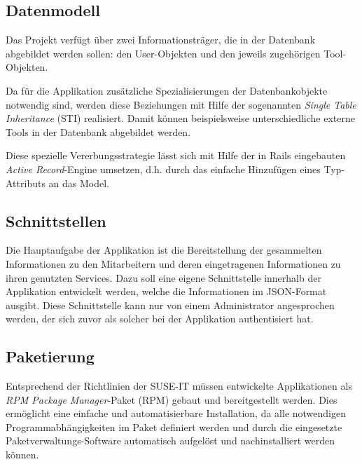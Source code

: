 \subsection{Datenmodell}
\label{sec:Datenmodell}
Das Projekt verfügt über zwei Informationsträger, die in der Datenbank abgebildet werden
sollen: den User-Objekten und den jeweils zugehörigen Tool-Objekten.


Da für die Applikation zusätzliche Spezialisierungen der Datenbankobjekte notwendig sind, werden
diese Beziehungen mit Hilfe der sogenannten \textit{Single Table Inheritance} (\acs{STI}) realisiert.
Damit können beispielsweise unterschiedliche externe Tools in der Datenbank abgebildet werden.


Diese spezielle Vererbungsstrategie lässt sich mit Hilfe der in Rails eingebauten
\textit{Active Record}-Engine umsetzen, d.h. durch das einfache Hinzufügen eines Typ-Attributs an das Model.

\subsection{Schnittstellen}
\label{sec:Schnittstellen}
Die Hauptaufgabe der Applikation ist die Bereitstellung der gesammelten Informationen zu den
Mitarbeitern und deren eingetragenen Informationen zu ihren genutzten Services. Dazu soll eine
eigene Schnittstelle innerhalb der Applikation entwickelt werden, welche die Informationen im
JSON-Format ausgibt. Diese Schnittstelle kann nur von einem Administrator angesprochen
werden, der sich zuvor als solcher bei der Applikation authentisiert hat.


\subsection{Paketierung}
\label{sec:Paketierung}

Entsprechend der Richtlinien der SUSE-IT müssen entwickelte
Applikationen als \textit{RPM Package Manager}-Paket (\acs{RPM}) gebaut und bereitgestellt werden. Dies
ermöglicht eine einfache und automatisierbare Installation, da alle
notwendigen Programmabhängigkeiten im Paket definiert werden und durch
die eingesetzte Paketverwaltungs-Software automatisch aufgelöst und
nachinstalliert werden können.

